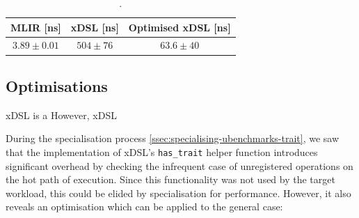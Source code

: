 
\begin{table}[H]
  \caption{.}
  \label{tab:constant-folding-optimised}
  \centering
  \begin{tabular}{ccc}
    \toprule
    \textbf{MLIR [ns]} & \textbf{xDSL [ns]} & \textbf{Optimised xDSL [ns]} \\
    \midrule
    $3.89 \pm 0.01$ & $504 \pm 76$ & $63.6 \pm 40$\\
    \bottomrule
  \end{tabular}
\end{table}







\subsection{Optimisations}
\label{sec:specialising-pattern-rewriting-optimisations}

xDSL is a
However, xDSL


During the specialisation process \autoref{ssec:specialising-ubenchmarks-trait}, we saw that the implementation of xDSL's \texttt{has\_trait} helper function introduces significant overhead by checking the infrequent case of unregistered operations on the hot path of execution.
Since this functionality was not used by the target workload, this could be elided by specialisation for performance. However, it also reveals an optimisation which can be applied to the general case:


